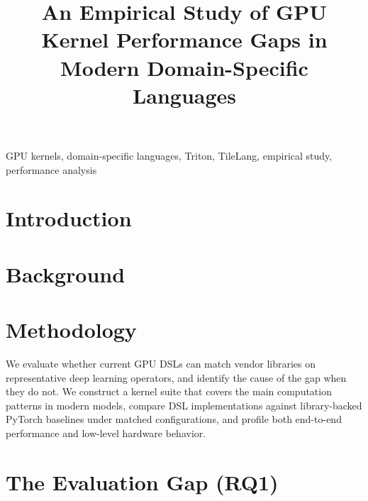 \documentclass[10pt,conference]{IEEEtran}
\begin{document}
\title{An Empirical Study of {GPU} Kernel Performance Gaps in Modern Domain-Specific Languages}

\author{
}

\maketitle
\linenumbers
\pagestyle{plain}

\begin{abstract}
  
\end{abstract}

\begin{IEEEkeywords}
GPU kernels, domain-specific languages, Triton, TileLang, 
empirical study, performance analysis
\end{IEEEkeywords}

\section{Introduction}
\label{sec:introduction}


\section{Background}
\label{sec:background}


\section{Methodology}
\label{sec:methodology}
We evaluate whether current GPU DSLs can match vendor libraries on representative deep learning operators, and identify the cause of the gap when they do not. We construct a kernel suite that covers the main computation patterns in modern models, compare DSL implementations against library-backed PyTorch baselines under matched configurations, and profile both end-to-end performance and low-level hardware behavior.



\section{The Evaluation Gap (RQ1)}
\label{sec:evaluation}

\end{document}
